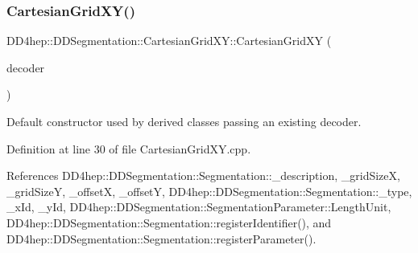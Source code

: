 \hypertarget{class_d_d4hep_1_1_d_d_segmentation_1_1_cartesian_grid_x_y_a1df3c8a66b3c58d8d93ede3db742a5c6}{}\label{class_d_d4hep_1_1_d_d_segmentation_1_1_cartesian_grid_x_y_a1df3c8a66b3c58d8d93ede3db742a5c6} 
\subsubsection{\texorpdfstring{Cartesian\+Grid\+X\+Y()}{CartesianGridXY()}\hspace{0.1cm}{\footnotesize\ttfamily [2/2]}}
{\footnotesize\ttfamily D\+D4hep\+::\+D\+D\+Segmentation\+::\+Cartesian\+Grid\+X\+Y\+::\+Cartesian\+Grid\+XY (\begin{DoxyParamCaption}\item[{\hyperlink{class_d_d4hep_1_1_d_d_segmentation_1_1_bit_field64}{Bit\+Field64} $\ast$}]{decoder }\end{DoxyParamCaption})}



Default constructor used by derived classes passing an existing decoder. 



Definition at line 30 of file Cartesian\+Grid\+X\+Y.\+cpp.



References D\+D4hep\+::\+D\+D\+Segmentation\+::\+Segmentation\+::\+\_\+description, \+\_\+grid\+SizeX, \+\_\+grid\+SizeY, \+\_\+offsetX, \+\_\+offsetY, D\+D4hep\+::\+D\+D\+Segmentation\+::\+Segmentation\+::\+\_\+type, \+\_\+x\+Id, \+\_\+y\+Id, D\+D4hep\+::\+D\+D\+Segmentation\+::\+Segmentation\+Parameter\+::\+Length\+Unit, D\+D4hep\+::\+D\+D\+Segmentation\+::\+Segmentation\+::register\+Identifier(), and D\+D4hep\+::\+D\+D\+Segmentation\+::\+Segmentation\+::register\+Parameter().

\hypertarget{class_d_d4hep_1_1_d_d_segmentation_1_1_cartesian_grid_x_y_aeaad4807131cbd3536718b66a0a76b0d}{}\label{class_d_d4hep_1_1_d_d_segmentation_1_1_cartesian_grid_x_y_aeaad4807131cbd3536718b66a0a76b0d} 
